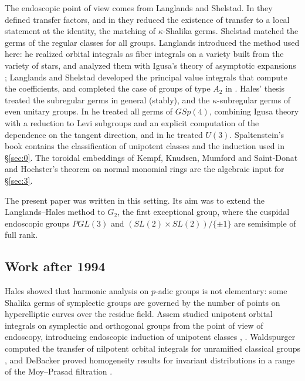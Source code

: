 \documentclass[12pt,letterpaper]{amsart}
\theoremstyle{plain}
\theoremstyle{definition}
\theoremstyle{remark}
\theoremstyle{definition}
\begin{document}
The endoscopic point of view comes from Langlands and Shelstad. In
\cite{LS87} they defined transfer factors, and in \cite{LS90} they reduced the
existence of transfer to a local statement at the identity, the matching of
$\kappa$-Shalika germs. Shelstad \cite{She89} matched the germs of the regular
classes for all groups. Langlands \cite{La83} introduced the method used here:
he realized orbital integrals as fiber integrals on a variety built from the
variety of stars, and analyzed them with Igusa's theory of asymptotic
expansions \cite{Ig78}; Langlands and Shelstad \cite{LS83} developed the
principal value integrals that compute the coefficients, and completed the
case of groups of type $A_2$ in \cite{LS89}. Hales' thesis \cite{Ha92a}
treated the subregular germs in general (stably), and the $\kappa$-subregular
germs of even unitary groups. In \cite{Ha89} he treated all germs of $GSp(4)$,
combining Igusa theory with a reduction to Levi subgroups and an explicit
computation of the dependence on the tangent direction, and in \cite{Ha92b}
he treated $U(3)$. Spaltenstein's book \cite{Spa82} contains the
classification of unipotent classes and the induction used in \S\ref{sec:0}.
The toroidal embeddings of Kempf, Knudsen, Mumford and Saint-Donat \cite{Ke72}
and Hochster's theorem \cite{Ho72} on normal monomial rings are the algebraic
input for \S\ref{sec:3}.

The present paper was written in this setting. Its aim was to extend the
Langlands--Hales method to $G_2$, the first exceptional group, where the
cuspidal endoscopic groups $PGL(3)$ and $(SL(2)\times SL(2))/\{\pm1\}$ are
semisimple of full rank.

\subsection*{Work after 1994}

Hales \cite{Ha94} showed that harmonic analysis on $p$-adic groups is not
elementary: some Shalika germs of symplectic groups are governed by the number
of points on hyperelliptic curves over the residue field. Assem studied unipotent orbital
integrals on symplectic and orthogonal groups from the point of view of
endoscopy, introducing endoscopic induction of unipotent classes
\cite{As98}, \cite{As00}. Waldspurger computed the transfer of nilpotent
orbital integrals for unramified classical groups \cite{Wa01}, and DeBacker
proved homogeneity results for invariant distributions in a range of the
Moy--Prasad filtration \cite{De02}.
\end{document}
